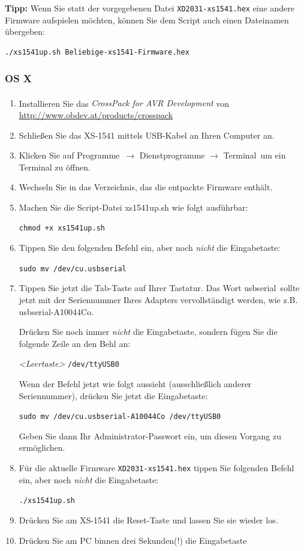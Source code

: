 \documentclass[10pt,a4paper]{scrartcl}		%
\begin{document}
\textbf{Tipp:} Wenn Sie statt der vorgegebenen Datei 
\texttt{XD2031-xs1541.hex}
eine andere Firmware aufspielen möchten, können Sie
dem Script auch einen Dateinamen übergeben:

\begin{verbatim}
./xs1541up.sh Beliebige-xs1541-Firmware.hex
\end{verbatim}

\subsubsection*{OS X}

\begin{enumerate}
\item Installieren Sie das \textit{CrossPack for 
AVR\textsuperscript{\textregistered} Development} von 
\\\url{http://www.obdev.at/products/crosspack}
\item Schließen Sie das XS-1541 mittels USB-Kabel an Ihren Computer an.
\item Klicken Sie auf \glqq Programme\grqq\ $\to$ \glqq Dienstprogramme\grqq
$\to$ \glqq Terminal\grqq\ um ein Terminal zu öffnen.
\item Wechseln Sie in das Verzeichnis, das die entpackte Firmware enthält.
\item Machen Sie die Script-Datei xs1541up.sh wie folgt ausführbar:

\texttt{chmod +x xs1541up.sh}
\item Tippen Sie den folgenden Befehl ein, aber noch \textit{nicht} die
Eingabetaste:

\texttt{sudo mv /dev/cu.usbserial}

\item Tippen Sie jetzt die Tab-Taste auf Ihrer Tastatur. Das Wort
\glqq usbserial\grqq\ sollte jetzt mit der Seriennummer Ihres Adapters
vervollständigt werden, wie z.B. usbserial-A10044Co.

Drücken Sie noch immer \textit{nicht} die Eingabetaste, sondern fügen
Sie die folgende Zeile an den Behl an:

\textit{<Leertaste>} \texttt{/dev/ttyUSB0}

Wenn der Befehl jetzt wie folgt aussieht (ausschließlich anderer
Seriennummer), drücken Sie jetzt die Eingabetaste:

\texttt{sudo mv /dev/cu.usbserial-A10044Co /dev/ttyUSB0}

Geben Sie dann Ihr Administrator-Passwort ein, um diesen Vorgang
zu ermöglichen.
\item Für die aktuelle Firmware 
   \texttt{XD2031-xs1541.hex} tippen Sie
	folgenden Befehl ein, aber noch \textit{nicht} die 
	Eingabetaste:

	\texttt{./xs1541up.sh}

\item Drücken Sie am XS-1541 die Reset-Taste und lassen Sie sie wieder los.
\item Drücken Sie am PC binnen drei Sekunden(!) die Eingabetaste
\end{enumerate}
\end{document}
